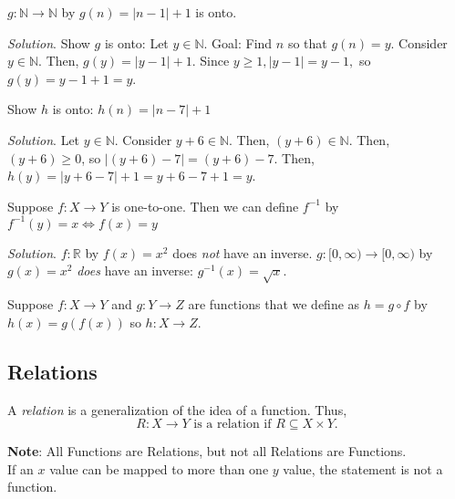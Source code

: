\documentclass{article}
\newenvironment{solution}{\textit{Solution}.}
\newcommand{\proofseparator}{\par\noindent\rule{\textwidth}{0.4pt}}
\newcommand{\N}{\ensuremath{\mathbb{N}}}
\newcommand{\R}{\ensuremath{\mathbb{R}}}
\begin{document}
        \begin{example}
            $g\colon \N\rightarrow \N$ by $g(n) = |n-1| + 1$ is onto.
        \end{example}

        \begin{solution}
            Show $g$ is onto: Let $y\in \N$. Goal: Find $n$ so that $g(n)=y$. Consider $y\in \N$. Then, $g(y) = |y-1| + 1$. Since $y\geq 1, |y-1| = y -1,$ so $g(y) = y - 1 + 1 = y$. 
        \end{solution}

        \proofseparator

        \begin{example}
             Show $h$ is onto: $h(n) = |n-7| + 1$
        \end{example}

        \begin{solution}
            Let $y\in \N$. Consider $y + 6\in \N$. Then, $(y + 6) \in \N$. Then, $(y + 6) \geq 0$, so $|(y+6) - 7| = (y+ 6) - 7$. Then, $h(y) = |y+6-7| + 1 = y +6-7+1 = y$.
        \end{solution}

        \proofseparator

        \begin{example}
            Suppose $f\colon X\rightarrow Y$ is one-to-one. Then we can define $f^{-1}$ by $f^{-1}(y) =x \iff f(x)=y$
        \end{example}

        \begin{solution}
            $f\colon \R$ by $f(x) = x^2$ does \textit{not} have an inverse. $g\colon [0,\infty) \rightarrow [0, \infty)$ by $g(x) = x^2$ \textit{does} have an inverse: $g^{-1}(x)=\sqrt{x}$.
        \end{solution}

        \proofseparator

        \begin{example}
            Suppose $f\colon X\rightarrow Y$ and $g\colon Y\rightarrow Z$ are functions that we define as $h = g \circ f$ by $h(x) = g(f(x))$ so $h\colon X\rightarrow Z$.
        \end{example}

    \subsection{Relations}

        \begin{definition}
            A \textit{relation} is a generalization of the idea of a function. 
            Thus, $$R\colon X\rightarrow Y \text{ is a relation if } R\subseteq X\times Y.$$
        \end{definition}
        \textbf{Note}: All Functions are Relations, but not all Relations are Functions. \\
        If an $x$ value can be mapped to more than one $y$ value, the statement is not a function. \\
\end{document}
